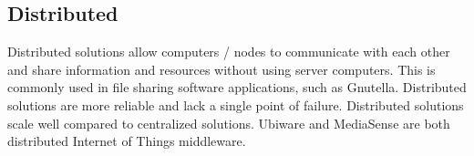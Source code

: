 \subsection{Distributed}
Distributed solutions allow computers / nodes to communicate with each other and share information and resources without using server computers. This is commonly used in file sharing software applications, such as Gnutella. Distributed solutions are more reliable and lack a single point of failure. Distributed solutions scale well compared to centralized solutions. Ubiware \cite{osterle2010memorandum} and MediaSense \cite{TheMediaSenseFramework} are both distributed Internet of Things middleware. 

